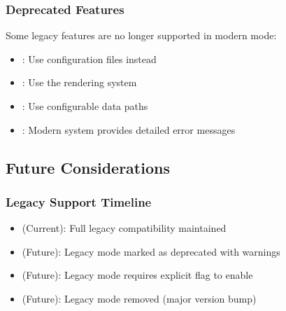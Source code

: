 \documentclass[letterpaper,10pt,english]{sphinxmanual}
\begin{document}
\subsubsection{Deprecated Features}
\label{\detokenize{developer/legacy:deprecated-features}}
\sphinxAtStartPar
Some legacy features are no longer supported in modern mode:
\begin{itemize}
\item {} 
\sphinxAtStartPar
{}: Use configuration files instead

\item {} 
\sphinxAtStartPar
{}: Use the rendering system

\item {} 
\sphinxAtStartPar
{}: Use configurable data paths

\item {} 
\sphinxAtStartPar
{}: Modern system provides detailed error messages

\end{itemize}


\subsection{Future Considerations}
\label{\detokenize{developer/legacy:future-considerations}}

\subsubsection{Legacy Support Timeline}
\label{\detokenize{developer/legacy:legacy-support-timeline}}\begin{itemize}
\item {} 
\sphinxAtStartPar
{} (Current): Full legacy compatibility maintained

\item {} 
\sphinxAtStartPar
{} (Future): Legacy mode marked as deprecated with warnings

\item {} 
\sphinxAtStartPar
{} (Future): Legacy mode requires explicit flag to enable

\item {} 
\sphinxAtStartPar
{} (Future): Legacy mode removed (major version bump)

\end{itemize}
\end{document}
